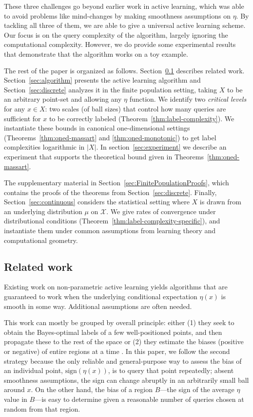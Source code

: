 \documentclass[twoside]{article}
\def\X{{\mathcal X}}
\begin{document}
These three challenges go beyond earlier work in active learning,
which was able to avoid problems like mind-changes by making
smoothness assumptions on $\eta$. By tackling all three of them, we
are able to give a universal active learning scheme. Our focus is on
the query complexity of the algorithm, largely ignoring the
computational complexity. However, we do provide some experimental results that demonstrate that the algorithm works on a toy example.

The rest of the paper is organized as
follows. Section~\ref{sec:relatedwork} describes related work.
Section~\ref{sec:algorithm} presents the active learning algorithm and
Section~\ref{sec:discrete} analyzes it in the finite population
setting, taking $X$ to be an arbitrary point-set and allowing any
$\eta$ function. We identify two \emph{critical levels} for any
$x \in X$: two scales (of ball sizes) that control how many queries
are sufficient for $x$ to be correctly labeled
(Theorem~\ref{thm:label-complexity}). We instantiate these bounds in
canonical one-dimensional settings (Theorems~\ref{thm:oned-massart}
and \ref{thm:oned-monotonic}) to get label complexities logarithmic in
$|X|$. In section~\ref{sec:experiment} we describe an experiment that supports the theoretical bound given in Theorems~\ref{thm:oned-massart}.

The supplementary material in
Section~\ref{sec:FinitePopulationProofs}, which contains the proofs of
the theorems from Section~\ref{sec:discrete}.  Finally,
Section~\ref{sec:continuous} considers the statistical setting where
$X$ is drawn from an underlying distribution $\mu$ on $\X$. We give
rates of convergence under distributional conditions
(Theorem~\ref{thm:label-complexity-specific}), and instantiate them
under common assumptions from learning theory and computational
geometry.

\subsection{Related work} \label{sec:relatedwork}

Existing work on non-parametric active learning yields algorithms that are guaranteed to work when the underlying conditional expectation $\eta(x)$ is smooth in some way. Additional assumptions are often needed.

This work can mostly be grouped by overall principle: either (1) they
seek to obtain the Bayes-optimal labels of a few well-positioned
points, and then propagate these to the rest of the space
\cite{DNZ15,H17,ASU18} or (2) they estimate the biases (positive or
negative) of entire regions at a time \cite{DH08,M12}. In this paper,
we follow the second strategy because the only reliable and
general-purpose way to assess the bias of an individual point,
$\mbox{sign}(\eta(x))$, is to query that point repeatedly; absent
smoothness assumptions, the sign can change abruptly in an arbitrarily
small ball around $x$. On the other hand, the bias of a region
$B$---the sign of the average $\eta$ value in $B$---is easy to
determine given a reasonable number of queries chosen at random from that region.
\end{document}
